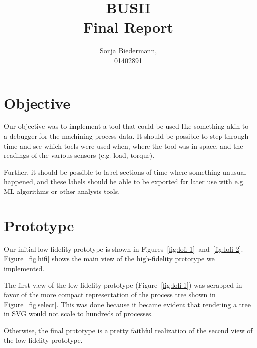 \documentclass[naustrian]{scrartcl}
\begin{document}
\title{BUSII\\Final Report}

\author{Sonja Biedermann,\\01402891}

\maketitle

\section{Objective}

Our objective was to implement a tool that could be used like something akin
to a debugger for the machining process data. It should be possible to step
through time and see which tools were used when, where the tool was in space,
and the readings of the various sensors (e.g. load, torque).

Further, it should be possible to label sections of time where something unusual
happened, and these labels should be able to be exported for later use with e.g.
ML algorithms or other analysis tools.

\section{Prototype}

Our initial low-fidelity prototype is shown in
Figures~\ref{fig:lofi-1}~and~\ref{fig:lofi-2}.  Figure~\ref{fig:hifi} shows the
main view of the high-fidelity prototype we implemented.

The first view of the low-fidelity prototype (Figure~\ref{fig:lofi-1}) was
scrapped in favor of the more compact representation of the process tree shown
in Figure~\ref{fig:select}. This was done because it became evident that
rendering a tree in SVG would not scale to hundreds of processes.

Otherwise, the final prototype is a pretty faithful realization of the second view
of the low-fidelity prototype.
\end{document}
